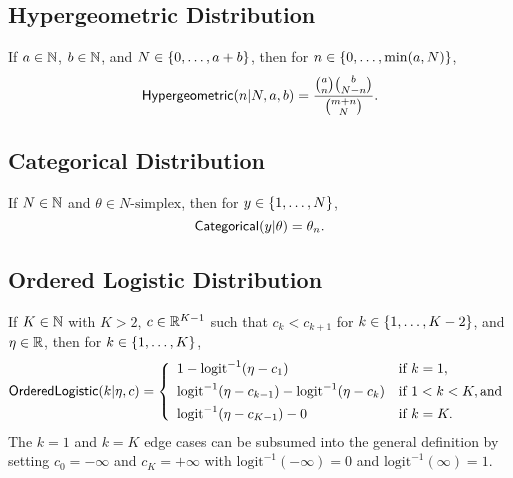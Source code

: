 \subsection{Hypergeometric Distribution}

If $a \in \mathbb{N}$, $b \in \mathbb{N}$, and $N \in \{ 0,\ldots,a+b \}$,
then for $n \in \{ 0,\ldots,\min(a,N) \}$, 
\[
\mbox{\sf Hypergeometric}(n|N,a,b)
=
\frac{\normalsize{a \choose n} {b \choose {N - n}}}
     {\normalsize{{m + n} \choose N}}.
\]

\begin{description}
%

%
\end{description}

\subsection{Categorical Distribution}

If $N \in \mathbb{N}$ and $\theta \in \mbox{$N$-simplex}$, then for $y \in
\{ 1,\ldots,N \}$, 
\[
\mbox{\sf Categorical}(y|\theta) = \theta_n.
\]

\begin{description}
\end{description}

\subsection{Ordered Logistic Distribution}

If $K \in \mathbb{N}$ with $K > 2$, $c \in \mathbb{R}^{K-1}$ such that $c_k <
c_{k+1}$ for $k \in \{ 1,\ldots,K-2 \}$, and $\eta \in \mathbb{R}$, then for $k \in
\{ 1,\ldots,K \}$,
\[
\mbox{\sf OrderedLogistic}(k|\eta,c)
=
\left\{
\begin{array}{ll}
1 - \mbox{logit}^{-1}(\eta - c_1) & \mbox{if } k = 1,
\\[4pt]
\mbox{logit}^{-1}(\eta - c_{k-1}) - \mbox{logit}^{-1}(\eta -
c_{k})
& \mbox{if } 1 < k < K, \mbox{and}
\\[4pt]
\mbox{logit}^{-1}(\eta - c_{K-1}) - 0
& \mbox{if } k = K.
\end{array}
\right.
\]
%
The $k=1$ and $k=K$ edge cases can be subsumed into the general definition
by setting $c_0 = -\infty$ and $c_K = +\infty$ with
$\mbox{logit}^{-1}(-\infty) = 0$ and $\mbox{logit}^{-1}(\infty) = 1$.
%
\begin{description}
\end{description}


